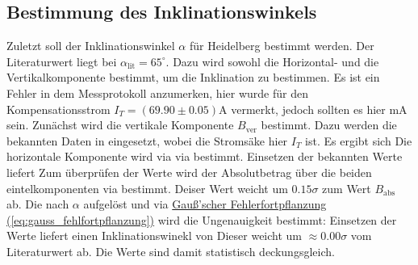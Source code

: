 \subsection{Bestimmung des Inklinationswinkels}
Zuletzt soll der Inklinationswinkel $\alpha$ für Heidelberg bestimmt werden. Der Literaturwert liegt bei $\alpha_\text{lit} = 65^\circ$. 
Dazu wird sowohl die Horizontal- und die Vertikalkomponente bestimmt, um die Inklination zu bestimmen. 
Es ist ein Fehler in dem Messprotokoll anzumerken, hier wurde für den Kompensationsstrom $I_T = (69.90 \pm 0.05)$A vermerkt, jedoch sollten es hier mA sein. 
Zunächst wird die vertikale Komponente $B_\text{ver}$ bestimmt. Dazu werden die bekannten Daten in  eingesetzt, wobei die Stromsäke hier $I_T$ ist. Es ergibt sich 
Die horizontale Komponente wird via via  bestimmt. Einsetzen der bekannten Werte liefert
Zum überprüfen der Werte wird der Absolutbetrag über die beiden eintelkomponenten via  bestimmt.
Deiser Wert weicht um $0.15\sigma$ zum Wert $B_\text{abs}$ ab. Die  nach $\alpha$ aufgelöst und via \hyperref[eq:gauss_fehlfortpflanzung]{Gauß'scher Fehlerfortpflanzung (\ref*{eq:gauss_fehlfortpflanzung})} wird die Ungenauigkeit bestimmt:
Einsetzen der Werte liefert einen Inklinationswinekl von
Dieser weicht um $\approx 0.00\sigma$ vom Literaturwert ab. Die Werte sind damit statistisch deckungsgleich.